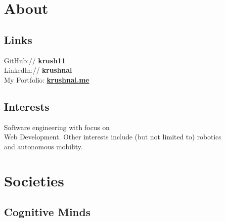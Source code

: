 \documentclass[letterpaper]{deedy-resume} %
\begin{document}
\begin{minipage}[t]{0.33\textwidth}
\sectionspace %

\section{About} 

\subsection{Links}
GitHub:// {\bf krush11} \\
LinkedIn:// {\bf krushnal} \\
My Portfolio: \textbf{\href{http://krushnal.me/}{krushnal.me}} \\

\sectionspace

\subsection{Interests}
Software engineering with focus on \\
Web Development. Other interests include 
(but not limited to) robotics\\
and autonomous mobility.

\sectionspace %

\section{Societies}
\subsection{Cognitive Minds}

\sectionspace %

\end{minipage} %
\hfill
%
%
\end{document}
